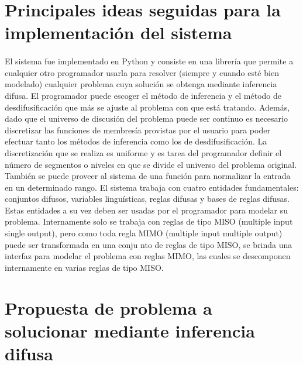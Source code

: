 \documentclass[a4paper,10pt]{article}
\begin{document}

\section{Principales ideas seguidas para la implementación del sistema}\label{sec:2}

  \paragraph{} El sistema fue implementado en Python y consiste en una librería que permite a cualquier otro programador usarla para
  resolver (siempre y cuando esté bien modelado) cualquier problema cuya solución se obtenga mediante inferencia difusa. El programador
  puede escoger el método de inferencia y el método de desdifusificación que más se ajuste al problema con que está tratando. Además, dado que
  el universo de discusión del problema puede ser continuo es necesario discretizar las funciones de membresía provistas por el usuario
  para poder efectuar tanto los métodos de inferencia como los de desdifusificación. La discretización que se realiza es uniforme y es tarea del
  programador definir el número de segmentos o niveles en que se divide el universo del problema original. También se puede proveer al sistema de
  una función para normalizar la entrada en un determinado rango. El sistema trabaja con cuatro entidades fundamentales: conjuntos difusos, variables
  linguísticas, reglas difusas y bases de reglas difusas. Estas entidades a su vez deben ser usadas por el programador para modelar su problema. Internamente solo
  se trabaja con reglas de tipo MISO (multiple input single output), pero como toda regla MIMO (multiple input multiple output) puede ser transformada en una conju
  nto de reglas de tipo MISO, se brinda una interfaz para modelar el problema con reglas MIMO, las cuales se descomponen internamente en varias reglas de tipo MISO.   


\section{Propuesta de problema a solucionar mediante inferencia difusa}\label{sec:3}
\end{document}
